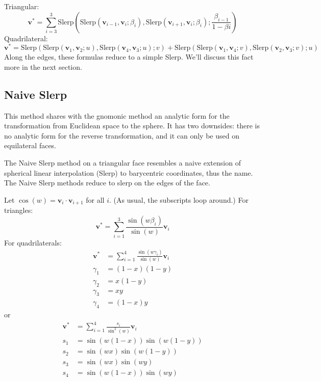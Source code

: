 \documentclass{amsart}[12pt]
\begin{document}
Triangular:
\begin{equation}\label{eq:nst}
\mathbf v^* = \sum^3_{i=3} \mathrm{Slerp}(
\mathrm{Slerp}(\mathbf v_{i-1}, \mathbf v_i; \beta_{i}),
\mathrm{Slerp}(\mathbf v_{i+1}, \mathbf v_i; \beta_{i});
\frac{\beta_{i-1}}{1-\beta{i}})
\end{equation}
Quadrilateral:
\begin{equation}\label{eq:nsq}
\mathbf v^*
= \mathrm{Slerp}(
\mathrm{Slerp}(\mathbf v_1, \mathbf v_2; u),
\mathrm{Slerp}(\mathbf v_4, \mathbf v_3; u); v)
+ \mathrm{Slerp}(
\mathrm{Slerp}(\mathbf v_1, \mathbf v_4; v),
\mathrm{Slerp}(\mathbf v_2, \mathbf v_3; v); u)
\end{equation}
Along the edges, these formulas reduce to a simple Slerp.
We'll discuss this fact more in the next section.

\subsection{Naive Slerp}

This method shares with the gnomonic method an analytic form for the
transformation from Euclidean space to the sphere. It has two downsides: there is no analytic form
for the reverse transformation, and it can only be used on equilateral faces.

The Naive Slerp method on a triangular face resembles a naive extension of
spherical linear interpolation (Slerp) to barycentric coordinates, thus the
name. The Naive Slerp methods reduce to slerp on the edges of the face.

Let $\cos(w) = \mathbf v_i \cdot \mathbf v_{i+1}$ for all $i$. (As
usual, the subscripts loop around.) For triangles:
\begin{equation}
   \mathbf v^* = \sum_{i=1}^3\frac{\sin(w\beta_i)}{\sin(w)}  \mathbf v_i
\end{equation}
For quadrilaterals:
\begin{equation}\begin{split}
     \mathbf v^* & = \sum_{i=1}^4\frac{\sin(w\gamma_i)}{\sin(w)} \mathbf v_i \\
\gamma_1 & = (1-x)(1-y) \\
\gamma_2 & = x(1-y) \\
\gamma_3 & = xy \\
\gamma_4 & = (1-x)y
\end{split}\end{equation}
or
\begin{equation}\begin{split}
   \mathbf v^* & = \sum_{i=1}^4\frac{s_i}{\sin^2(w)}  \mathbf v_i \\
s_1 &  = \sin (w(1-x))\sin (w(1-y)) \\
s_2 & = \sin (wx)\sin (w(1-y)) \\
s_3 & = \sin (wx)\sin (wy) \\
s_4 & = \sin (w(1-x))\sin (wy)
\end{split}\end{equation}
\end{document}
